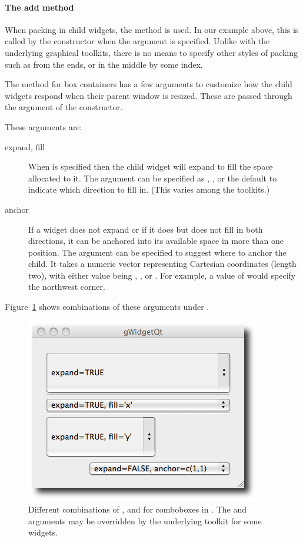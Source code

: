 \paragraph{The add method}
When packing in child widgets, the  method is
used. In our example above, this is called by the
 constructor when the  argument is
specified. Unlike with the underlying graphical toolkits, there is no
means to specify other styles of packing such as from the ends, or in
the middle by some index.

The  method for box containers has a few arguments to
customize how the child widgets respond when their parent window is
resized. These are passed through the 
  argument of the constructor.

These arguments are:
\begin{description}
\item[expand, fill] When  is specified then the child
  widget will expand to fill the space allocated to it. The
   argument can be specified as , , or
  the default  to indicate which direction to fill
  in.  (This varies among the toolkits.)
  
  
\item[anchor] If a widget does not expand or if it does but does not fill in both
  directions, it can be anchored into its available space in more than
  one position. The  argument can be specified to suggest
  where to anchor the child. It takes a numeric vector representing
  Cartesian coordinates (length two),
  with either value being , , or . For
  example, a value of  would specify the northwest corner.
\end{description}

Figure~\ref{fig:gWidgets-ggroup-expand-fill-anchor} shows combinations
of these arguments under .


\begin{figure}
  \centering
  \includegraphics[width=.5\textwidth]{fig-gWidgets-ggroup-expand-fill-anchor}
  \caption{Different combinations of ,  and
     for comboboxes in . The 
    and  arguments
    may be overridden by the underlying toolkit for some widgets.}
  \label{fig:gWidgets-ggroup-expand-fill-anchor}
\end{figure}


